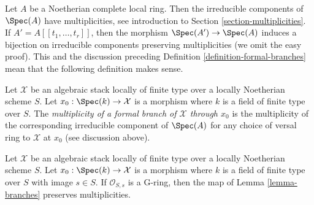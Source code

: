 \noindent
Let $A$ be a Noetherian complete local ring. Then the irreducible
components of $\Spec(A)$ have multiplicities, see
introduction to Section \ref{section-multiplicities}.
If $A' = A[[t_1, \ldots, t_r]]$, then the morphism
$\Spec(A') \to \Spec(A)$ induces a bijection on irreducible
components preserving multiplicities (we omit the easy proof).
This and the discussion preceding
Definition \ref{definition-formal-branches}
mean that the following definition makes sense.

\begin{definition}
\label{definition-multiplicity-formal-branches}
Let $\mathcal{X}$ be an algebraic stack locally of finite type
over a locally Noetherian scheme $S$. Let $x_0 : \Spec(k) \to \mathcal{X}$
is a morphism where $k$ is a field of finite type over $S$.
The {\it multiplicity of a formal branch of $\mathcal{X}$ through $x_0$}
is the multiplicity of the corresponding irreducible component of
$\Spec(A)$ for any choice of versal ring to $\mathcal{X}$ at $x_0$
(see discussion above).
\end{definition}

\begin{lemma}
\label{lemma-branches-multiplicity}
Let $\mathcal{X}$ be an algebraic stack locally of finite type
over a locally Noetherian scheme $S$. Let $x_0 : \Spec(k) \to \mathcal{X}$
is a morphism where $k$ is a field of finite type over $S$ with
image $s \in S$. If $\mathcal{O}_{S, s}$ is a G-ring, then
the map of Lemma \ref{lemma-branches} preserves multiplicities.
\end{lemma}

